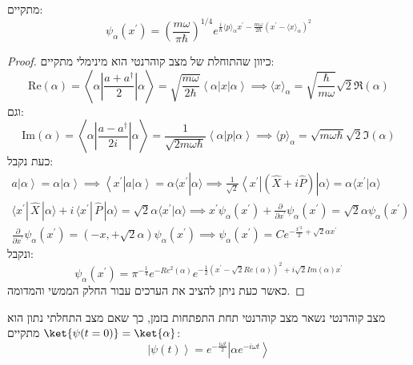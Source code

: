 \documentclass{tstextbook}
\begin{document}
\begin{proposition}
מתקיים:
$$\psi_{\alpha}\left( x^{\prime} \right)=\left( \frac{m\omega}{\pi\hbar} \right)^{1/4}e^{\frac{i}{\hbar}\langle p\rangle_{\alpha}x^{\prime}-\frac{m\omega}{2\hbar}\left( x^{\prime}-\langle x\rangle_{\alpha} \right)^{2}}$$

\end{proposition}
\begin{proof}
כיוון שהתוחלת של מצב קוהרנטי הוא מינימלי מתקיים:
$$\mathrm{Re}\left( \alpha \right)=\left\langle \alpha|\frac{a+a^{\dagger}}{2}|\alpha \right\rangle=\sqrt{\frac{m\omega}{2\hbar}}\left\langle \alpha|x|\alpha \right\rangle\implies \langle x\rangle_{\alpha}={\sqrt{\frac{\hbar}{m\omega}}}{\sqrt{2}}\Re\left( \alpha \right)$$
וגם:
$$\mathrm{Im}\left( \alpha \right)=\left\langle \alpha|\frac{a-a^{\dagger}}{2i}|\alpha \right\rangle=\frac{1}{\sqrt{2m\omega\hbar}}\left\langle \alpha|p|\alpha \right\rangle \implies \langle p\rangle_{\alpha}={\sqrt{m\omega\hbar}}\sqrt{2}\Im\left( \alpha \right)$$
כעת נקבל:
$$\begin{gather}a\left|\alpha\right\rangle=\alpha\left|\alpha\right\rangle\implies\left\langle x^{\prime}\right|a\left|\alpha\right\rangle=\alpha\langle x^{\prime}|\alpha\rangle\implies{\frac{1}{\sqrt{2}}}\left\langle x^{\prime}\right|\left({\hat{X}}+i{\hat{P}}\right)|\alpha\rangle=\alpha\langle x^{\prime}|\alpha\rangle \\\langle x^{\prime}|\,\hat{X}\,|\alpha\rangle+i\,\langle x^{\prime}|\,\hat{P}\,|\alpha\rangle=\sqrt{2}\alpha\langle x^{\prime}|\alpha\rangle\implies x^{\prime}\psi_{\alpha}\left(x^{\prime}\right)+\frac{\partial}{\partial x^{\prime}}\psi_{\alpha}\left(x^{\prime}\right)=\sqrt{2}\alpha\psi_{\alpha}\left(x^{\prime}\right) \\\frac{\partial}{\partial x^{\prime}}\psi_{\alpha}\left(x^{\prime}\right)=\left(-x,+\sqrt{2}\alpha\right)\psi_{\alpha}\left(x^{\prime}\right)\implies\psi_{\alpha}\left(x^{\prime}\right)=C e^{-\frac{x^{\prime2}}{2}+\sqrt{2}\alpha x^{\prime}}
\end{gather}$$
ונקבל:
$$\psi_{\alpha}\left(x^{\prime}\right)=\pi^{-\frac{1}{4}}e^{-R e^{2}\left(\alpha\right)}e^{-\frac{1}{2}\left(x^{\prime}-\sqrt{2}R e(\alpha)\right)^{2}+i\sqrt{2}I m(\alpha)x^{\prime}}$$
כאשר כעת ניתן להציב את הערכים עבור החלק הממשי והמדומה.

\end{proof}
\begin{proposition}
מצב קוהרנטי נשאר מצב קוהרנטי תחת התפתחות בזמן, כך שאם מצב התחלתי נתון הוא \(\ket{\psi(t=0)}=\ket{\alpha}\) מתקיים:
$$\left|\psi\left(t\right)\right\rangle=e^{-\frac{i\omega t}{2}}\left|\alpha e^{-i\omega t}\right\rangle$$

\end{proposition}
\end{document}
